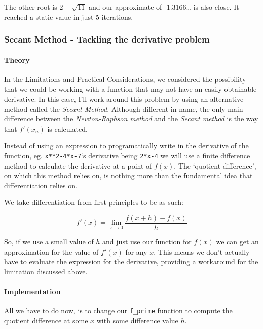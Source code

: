 \documentclass[
]{article}
\begin{document}
The other root is \(2-\sqrt{11}\) and our approximate of -1.3166\ldots{}
is also close. It reached a static value in just 5 iterations.

\hypertarget{header-n71}{%
\subsubsection{Secant Method - Tackling the derivative
problem}\label{header-n71}}

\hypertarget{header-n72}{%
\paragraph{Theory}\label{header-n72}}
\hfill \break
In the \protect\hyperlink{header-n38}{Limitations and Practical
Considerations}, we considered the possibility that we could be working
with a function that may not have an easily obtainable derivative. In
this case, I'll work around this problem by using an alternative method
called the \emph{Secant Method}. Although different in name, the only
main difference between the \emph{Newton-Raphson method} and the
\emph{Secant method} is the way that \(f'(x_n)\) is calculated.

Instead of using an expression to programatically write in the
derivative of the function, eg. \texttt{x**2-4*x-7}`s derivative being
\texttt{2*x-4} we will use a finite difference method to calculate the
derivative at a point of \(f(x)\). The `quotient difference', on which
this method relies on, is nothing more than the fundamental idea that
differentiation relies on.

We take differentiation from first principles to be as such:

\[f'(x)=\lim_{x\to0}\frac{f(x+h)-f(x)}{h}\]

So, if we use a small value of \(h\) and just use our function for
\(f(x)\) we can get an approximation for the value of \(f'(x)\) for any
\(x\). This means we don't actually have to evaluate the expression for
the derivative, providing a workaround for the limitation discussed
above.

\hypertarget{header-n78}{%
\paragraph{Implementation}\label{header-n78}}
\hfill \break
All we have to do now, is to change our \texttt{f\_prime} function to
compute the quotient difference at some \(x\) with some difference value
\(h\).
\end{document}
